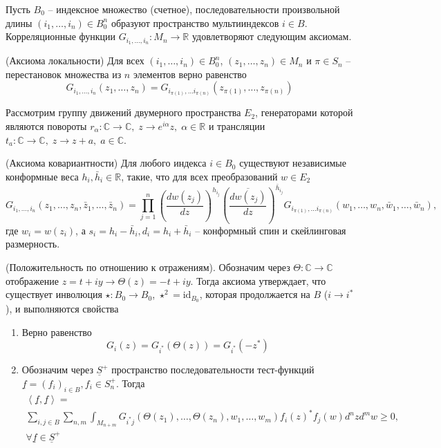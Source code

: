   Пусть $B_{0}$ -- индексное множество (счетное), последовательности произвольной длины $(i_{1},\dots,i_{n})\in B_{0}^{n}$ образуют пространство мультииндексов $i\in B$.  Корреляционные функции $G_{i_{1},\dots, i_{n}}:M_{n}\to \mathbb{R}$ удовлетворяют следующим аксиомам.
\begin{axiom}
  (Аксиома локальности)
  Для всех $(i_{1},\dots,i_{n})\in B_{0}^{n}$, $(z_{1},\dots, z_{n})\in M_{n}$ и $\pi\in S_{n}$ -- перестановок множества из $n$ элементов верно равенство
  \begin{equation}
    \label{eq:51}
    G_{i_{1},\dots,i_{n}}(z_{1},\dots,z_{n})=G_{i_{\pi(1)},\dots i_{\pi(n)}}(z_{\pi(1)},\dots, z_{\pi(n)})
  \end{equation}
\end{axiom}
Рассмотрим группу движений двумерного пространства $E_{2}$, генераторами которой являются повороты $r_{\alpha}:\mathbb{C}\to\mathbb{C}, \; z\to e^{i\alpha}z,\; \alpha\in \mathbb{R}$ и трансляции $t_{a}:\mathbb{C}\to\mathbb{C},\; z\to z+a,\; a\in\mathbb{C}$. 
\begin{axiom}
  (Аксиома ковариантности)
  Для любого индекса $i\in B_{0}$  существуют независимые конформные веса $h_{i},\bar h_{i}\in \mathbb{R}$, такие, что для всех преобразований $w\in E_{2}$
  \begin{equation}
    \label{eq:52}
    G_{i_{1},\dots,i_{n}}(z_{1},\dots,z_{n},\bar z_{1},\dots, \bar z_{n})=\prod_{j=1}^{n}\left(\frac{dw(z_{j})}{dz}\right)^{h_{i_{j}}}\left(\overline{\frac{dw(z_{j})}{dz}}\right)^{\bar{h}_{i_{j}}} G_{i_{\pi(1)},\dots i_{\pi(n)}}(w_{1},\dots, w_{n},\bar w_{1},\dots,\bar w_{n}),
  \end{equation}
где $w_{i}=w(z_{i})$, а $s_{i}=h_{i}-\bar h_{i}, d_{i}=h_{i}+\bar h_{i}$  -- конформный спин и скейлинговая размерность.
\end{axiom}
\begin{axiom}
  (Положительность по отношению к отражениям).
  Обозначим через $\Theta:\mathbb{C}\to\mathbb{C}$  отображение $z=t+i y\to \Theta(z)= -t+i y$. Тогда аксиома утверждает, что существует инволюция $\star:B_{0}\to B_{0}$, $\star^{2}=\mathrm{id}_{B_{0}}$, которая продолжается на $B$ ($i\to i^{*}$), и выполняются свойства
  \begin{enumerate}
  \item Верно равенство
    \begin{equation}
      \label{eq:53}
      G_{i}(z)=G_{i^{*}}(\Theta(z))=G_{i^{*}}(-z^{*})
    \end{equation}
  \item Обозначим через $\underline{S}^{+}$ пространство последовательности тест-функций $\underline{f}=(f_{i})_{i\in B}, f_{i}\in S^{+}_{n}$. Тогда
    \begin{multline}
      \label{eq:54}
      \left<\underline{f},\underline{f}\right>=\\
      \sum_{i,j\in B}\sum_{n,m}\int_{M_{n+m}}G_{i^{*} j}(\Theta(z_{1}),\dots ,\Theta(z_{n}),w_{1},\dots,w_{m}) f_{i}(z)^{*}f_{j}(w) d^{n}z d^{m}w 
      \geq 0,\\ \forall \underline{f}\in \underline{S}^{+}
    \end{multline}
  \end{enumerate}
\end{axiom}
